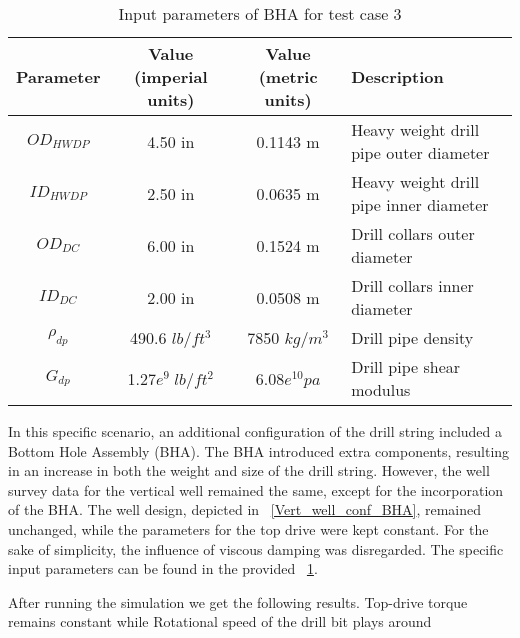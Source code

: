 \begin{table}
  \centering
  \begin{tabular}{|c|c|c|p{2.2in}|}
    \hline
    Parameter & Value (imperial units) & Value (metric units) & Description \\
    \hline
    $OD_{HWDP}$ & 4.50 in & 0.1143 m & Heavy weight drill pipe outer diameter \\
    \hline
    $ID_{HWDP}$ & 2.50 in & 0.0635 m & Heavy weight drill pipe inner diameter \\
    \hline
    $OD_{DC}$ & 6.00 in & 0.1524 m & Drill collars outer diameter \\
    \hline
    $ID_{DC}$ & 2.00 in & 0.0508 m & Drill collars inner diameter \\
    \hline
    $\rho_{dp}$ & 490.6 $lb/ft^{3}$ & 7850 $kg/m^{3}$ & Drill pipe density \\
    \hline
    $G_{dp}$ & 1.27$e^{9}\;lb/ft^{2}$ & 6.08$e^{10} pa$ & Drill pipe shear modulus \\
    \hline
  \end{tabular}
  \caption{Input parameters of BHA for test case 3}\label{Input Parameters TC3}
\end{table} 

In this specific scenario, an additional configuration of the drill string included a Bottom Hole Assembly (BHA). The BHA introduced extra components, resulting in an increase in both the weight and size of the drill string. However, the well survey data for the vertical well remained the same, except for the incorporation of the BHA. The well design, depicted in \figurename~\ref{Vert_well_conf_BHA}, remained unchanged, while the parameters for the top drive were kept constant. For the sake of simplicity, the influence of viscous damping was disregarded. The specific input parameters can be found in the provided \tablename~\ref{Input Parameters TC3}.

After running the simulation we get the following results. Top-drive torque remains constant while Rotational speed of the drill bit plays around
